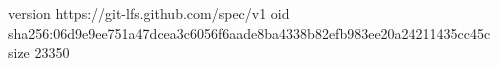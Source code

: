 version https://git-lfs.github.com/spec/v1
oid sha256:06d9e9ee751a47dcea3c6056f6aade8ba4338b82efb983ee20a24211435cc45c
size 23350
